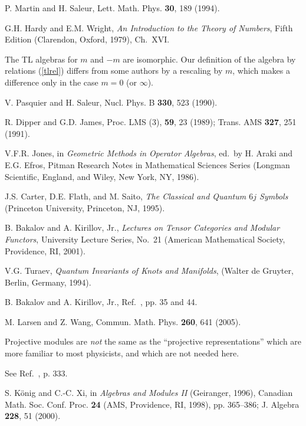 \documentclass[twocolumn,floats,pra]{revtex4}
\begin{document}
\begin{references}
 P. Martin and H. Saleur, Lett. Math. Phys. {\bf 30},
189 (1994).

 G.H. Hardy and E.M. Wright, {\it An Introduction to
the Theory of Numbers}, Fifth Edition (Clarendon, Oxford, 1979),
Ch.\ XVI.

 The TL algebras for $m$ and $-m$ are isomorphic. Our
definition of the algebra by relations (\ref{tlrel}) differs from
some authors by a rescaling by $m$, which makes a difference only
in the case $m=0$ (or $\infty$).

 V. Pasquier and  H. Saleur, Nucl. Phys. B {\bf 330}, 523
(1990).

R. Dipper and G.D. James, Proc. LMS (3), {\bf 59}, 23 (1989);
Trans. AMS {\bf 327}, 251 (1991).

 V.F.R. Jones, in {\it Geometric Methods in
Operator Algebras}, ed.\ by H. Araki and E.G. Efros, Pitman
Research Notes in Mathematical Sciences Series (Longman
Scientific, England, and Wiley, New York, NY, 1986).

 J.S. Carter, D.E. Flath, and M. Saito, {\it The
Classical and Quantum $6j$ Symbols} (Princeton University,
Princeton, NJ, 1995).

 B. Bakalov and A. Kirillov, Jr., {\it Lectures on Tensor
Categories and Modular Functors}, University Lecture Series, No.\
21 (American Mathematical Society, Providence, RI, 2001).

 V.G. Turaev, {\it Quantum Invariants of Knots
and Manifolds}, (Walter de Gruyter, Berlin, Germany, 1994).


 B. Bakalov and A. Kirillov, Jr., Ref.\ \cite{bk}, pp. 35 and
44.

 M. Larsen and Z. Wang, Commun. Math. Phys. {\bf
260}, 641 (2005).

 Projective modules \cite{pierce,anf} are {\em not}
the same as the ``projective representations'' which are more
familiar to most physicists, and which are not needed here.

 See Ref.\ \cite{anf}, p. 333.

 S. K\"onig and C.-C. Xi, in {\it Algebras and Modules II}
(Geiranger, 1996), Canadian Math. Soc. Conf. Proc. {\bf 24} (AMS,
Providence, RI, 1998), pp. 365--386; J. Algebra {\bf 228}, 51
(2000).


\end{references}
\end{document}
